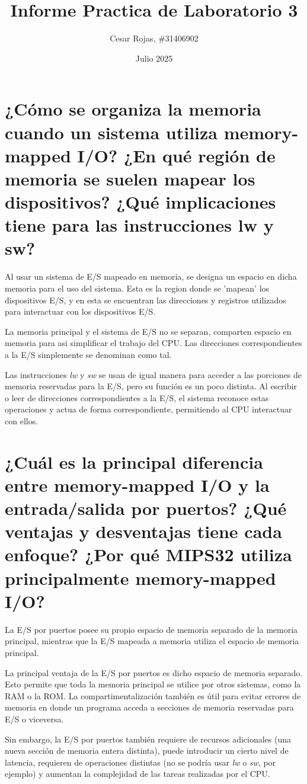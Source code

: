 \documentclass[titlepage]{article}
\title{Informe Practica de Laboratorio 3}
\author{Cesar Rojas, \#31406902}
\date{Julio 2025}
\begin{document}
\maketitle

\section*{¿Cómo se organiza la memoria cuando un sistema utiliza memory-mapped I/O? ¿En qué región de memoria se suelen mapear los dispositivos? ¿Qué implicaciones tiene para las instrucciones lw y sw?}

Al usar un sistema de E/S mapeado en memoria, se designa un espacio en dicha memoria para el uso del sistema. Esta es la region donde se 'mapean' los dispositivos E/S, y en esta se encuentran las direcciones y registros utilizados para interactuar con los dispositivos E/S.

La memoria principal y el sistema de E/S no se separan, comparten espacio en memoria para asi simplificar el trabajo del CPU. Las direcciones correspondientes a la E/S simplemente se denominan como tal.

Las instrucciones \emph{lw} y \emph{sw} se usan de igual manera para acceder a las porciones de memoria reservadas para la E/S, pero su función es un poco distinta. Al escribir o leer de direcciones correspondientes a la E/S, el sistema reconoce estas operaciones y actua de forma correspondiente, permitiendo al CPU interactuar con ellos.

\section*{¿Cuál es la principal diferencia entre memory-mapped I/O y la entrada/salida por puertos? ¿Qué ventajas y desventajas tiene cada enfoque? ¿Por qué MIPS32 utiliza principalmente memory-mapped I/O?}

La E/S por puertos posee su propio espacio de memoria separado de la memoria principal, mientras que la E/S mapeada a memoria utiliza el espacio de memoria principal.

La principal ventaja de la E/S por puertos es dicho espacio de memoria separado. Esto permite que toda la memoria principal se utilice por otros sistemas, como la RAM o la ROM. La  compartimentalización también es útil para evitar errores de memoria en donde un programa acceda a secciones de memoria reservadas para E/S o viceversa.

Sin embargo, la E/S por puertos también requiere de recursos adicionales (una nueva sección de memoria entera distinta), puede introducir un cierto nivel de latencia, requieren de operaciones distintas (no se podría usar \emph{lw} o \emph{sw}, por ejemplo) y aumentan la complejidad de las tareas realizadas por el CPU.
\end{document}
